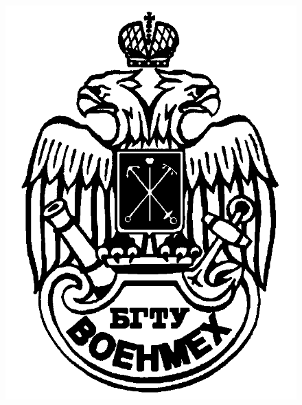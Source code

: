 \documentclass[
12pt, %
oneside, %
english, %
singlespacing, %
headsepline, %
]{LabWhitepaper} %
\numberwithin{equation}{section}
\numberwithin{figure}{section}
\begin{document}
\frontmatter %

\pagestyle{plain} %


\begin{titlepage}
	\begin{center}

		{\Large \univname\par}
		\vspace{0.4cm} %
		{\large \deptname\par}
		\vspace{0.2cm}
		{\large \groupname\par}
		\vspace{0.4cm} %
		\begin{figure}[h]
			\centering
			\includegraphics[scale=0.15]{Figures/UniversityLogoLarge.png}

\end{figure}
\end{center}
\end{titlepage}
\end{document}

